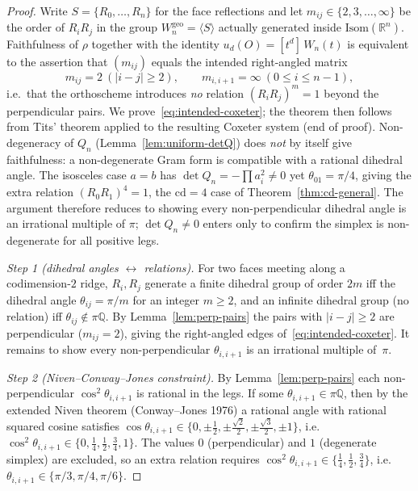 \documentclass[11pt,a4paper]{article}
\theoremstyle{remark}
\theoremstyle{plain}
\begin{document}
\begin{proof}
Write $S = \{R_0, \ldots, R_n\}$ for the face reflections and let
$m_{ij} \in \{2, 3, \ldots, \infty\}$ be the order of $R_i R_j$ in the
group $W_n^{\mathrm{geo}} = \langle S\rangle$ actually generated inside
$\mathrm{Isom}(\mathbb{R}^n)$.  Faithfulness of $\rho$ together with the
identity $u_d(O) = [t^d]\, W_n(t)$ is equivalent to the assertion that
$(m_{ij})$ equals the intended right-angled matrix
\begin{equation}
m_{ij} = 2 \ (|i-j| \ge 2), \qquad m_{i,i+1} = \infty \ (0 \le i \le n-1),
\tag{$\ast$}\label{eq:intended-coxeter}
\end{equation}
i.e.\ that the orthoscheme introduces \emph{no} relation $(R_i R_j)^m = 1$
beyond the perpendicular pairs.  We prove~\eqref{eq:intended-coxeter}; the
theorem then follows from Tits' theorem applied to the resulting Coxeter
system (end of proof).  Non-degeneracy of $Q_n$
(Lemma~\ref{lem:uniform-detQ}) does \emph{not} by itself give
faithfulness: a non-degenerate Gram form is compatible with a rational
dihedral angle.  The isosceles case $a = b$ has
$\det Q_n = -\prod a_i^2 \ne 0$ yet $\theta_{01} = \pi/4$, giving the
extra relation $(R_0 R_1)^4 = 1$, the $\mathrm{cd} = 4$ case of
Theorem~\ref{thm:cd-general}.  The argument therefore reduces to showing
every non-perpendicular dihedral angle is an irrational multiple of
$\pi$; $\det Q_n \ne 0$ enters only to confirm the simplex is
non-degenerate for all positive legs.

\emph{Step 1 (dihedral angles $\leftrightarrow$ relations).}  For two
faces meeting along a codimension-$2$ ridge, $R_i, R_j$ generate a finite
dihedral group of order $2m$ iff the dihedral angle $\theta_{ij} = \pi/m$
for an integer $m \ge 2$, and an infinite dihedral group (no relation)
iff $\theta_{ij} \notin \pi\mathbb{Q}$.  By Lemma~\ref{lem:perp-pairs}
the pairs with $|i-j| \ge 2$ are perpendicular ($m_{ij} = 2$), giving the
right-angled edges of~\eqref{eq:intended-coxeter}.  It remains to show
every non-perpendicular $\theta_{i,i+1}$ is an irrational multiple
of~$\pi$.

\emph{Step 2 (Niven--Conway--Jones constraint).}  By
Lemma~\ref{lem:perp-pairs} each non-perpendicular $\cos^2\theta_{i,i+1}$
is rational in the legs.  If some $\theta_{i,i+1} \in \pi\mathbb{Q}$,
then by the extended Niven theorem (Conway--Jones 1976) a rational angle
with rational squared cosine satisfies $\cos\theta_{i,i+1} \in
\{0, \pm\tfrac12, \pm\tfrac{\sqrt2}{2}, \pm\tfrac{\sqrt3}{2}, \pm 1\}$,
i.e.\ $\cos^2\theta_{i,i+1} \in \{0, \tfrac14, \tfrac12, \tfrac34, 1\}$.
The values $0$ (perpendicular) and $1$ (degenerate simplex) are
excluded, so an extra relation requires
$\cos^2\theta_{i,i+1} \in \{\tfrac14, \tfrac12, \tfrac34\}$, i.e.\
$\theta_{i,i+1} \in \{\pi/3, \pi/4, \pi/6\}$.


\end{proof}
\end{document}
